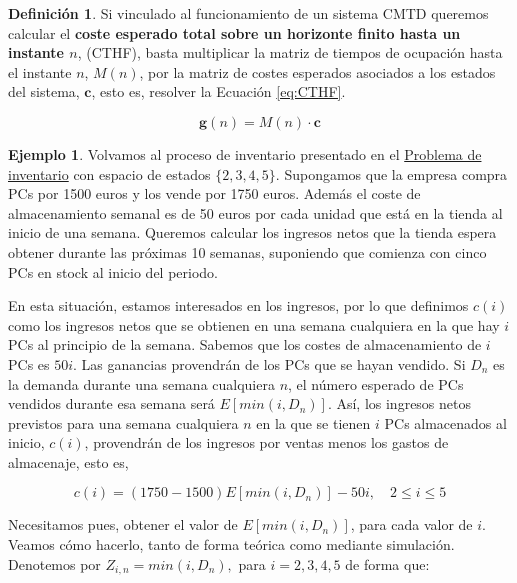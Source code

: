 \documentclass[
]{book}
\newenvironment{yellowbox}{
  \definecolor{shadecolor}{rgb}{210, 180, 140}  
  \color{black}
  \begin{shaded}}
 {\end{shaded}}
\theoremstyle{definition}
\newtheorem{definition}{Definición}[chapter]
\theoremstyle{definition}
\newtheorem{example}{Ejemplo}[chapter]
\theoremstyle{definition}
\theoremstyle{definition}
\theoremstyle{remark}
\begin{document}
\begin{yellowbox}

\begin{definition}

Si vinculado al funcionamiento de un sistema CMTD queremos calcular el \textbf{coste esperado total sobre un horizonte finito hasta un instante \(n\)}, (CTHF), basta multiplicar la matriz de tiempos de ocupación hasta el instante \(n\), \(M(n)\), por la matriz de costes esperados asociados a los estados del sistema, \(\mathbf{c}\), esto es, resolver la Ecuación \eqref{eq:CTHF}.

\begin{equation}
\mathbf{g}(n) = M(n) \cdot \mathbf{c}
\label{eq:CTHF}
\end{equation}

\end{definition}

\end{yellowbox}

\begin{example}
Volvamos al proceso de inventario presentado en el \protect\hyperlink{inventario}{Problema de inventario} con espacio de estados \(\{2,3,4,5\}\). Supongamos que la empresa compra PCs por 1500 euros y los vende por 1750 euros. Además el coste de almacenamiento semanal es de 50 euros por cada unidad que está en la tienda al inicio de una semana. Queremos calcular los ingresos netos que la tienda espera obtener durante las próximas 10 semanas, suponiendo que comienza con cinco PCs en stock al inicio del periodo.
\end{example}

En esta situación, estamos interesados en los ingresos, por lo que definimos \(c(i)\) como los ingresos netos que se obtienen en una semana cualquiera en la que hay \(i\) PCs al principio de la semana. Sabemos que los costes de almacenamiento de \(i\) PCs es \(50i\). Las ganancias provendrán de los PCs que se hayan vendido. Si \(D_n\) es la demanda durante una semana cualquiera \(n\), el número esperado de PCs vendidos durante esa semana será \(E[min(i, D_n)]\). Así, los ingresos netos previstos para una semana cualquiera \(n\) en la que se tienen \(i\) PCs almacenados al inicio, \(c(i)\), provendrán de los ingresos por ventas menos los gastos de almacenaje, esto es,

\[c(i) = (1750-1500)E[min(i, D_n)] -50i, \quad 2 \leq i \leq 5\]

Necesitamos pues, obtener el valor de \(E[min(i, D_n)]\), para cada valor de \(i\). Veamos cómo hacerlo, tanto de forma teórica como mediante simulación. Denotemos por \(Z_{i,n} = min(i, D_n),\) para \(i=2, 3, 4, 5\) de forma que:
\end{document}
